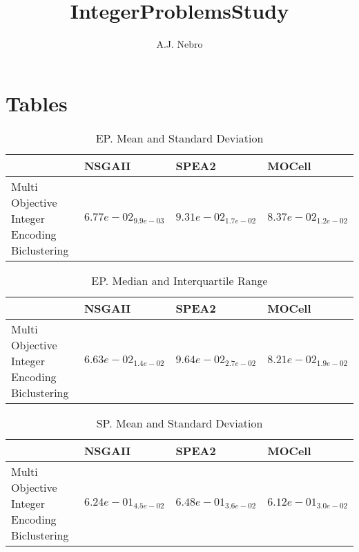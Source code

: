 \documentclass{article}
\title{IntegerProblemsStudy}
\author{A.J. Nebro}
\begin{document}
\maketitle
\section{Tables}

\begin{table}
\caption{EP. Mean and Standard Deviation}
\label{table: EP}
\centering
\begin{scriptsize}
\begin{tabular}{llll}
\hline & NSGAII & SPEA2 &  MOCell\\
\hline 
Multi Objective Integer Encoding Biclustering & \cellcolor{gray95}$  6.77e-02_{ 9.9e-03}$ & $  9.31e-02_{ 1.7e-02}$ & \cellcolor{gray25}$  8.37e-02_{ 1.2e-02}$ \\
\hline
\end{tabular}
\end{scriptsize}
\end{table}

\begin{table}
\caption{EP. Median and Interquartile Range}
\label{table: EP}
\centering
\begin{scriptsize}
\begin{tabular}{llll}
\hline & NSGAII & SPEA2 &  MOCell\\
\hline 
Multi Objective Integer Encoding Biclustering & \cellcolor{gray95}$  6.63e-02_{ 1.4e-02}$ & $  9.64e-02_{ 2.7e-02}$ & \cellcolor{gray25}$  8.21e-02_{ 1.9e-02}$ \\
\hline
\end{tabular}
\end{scriptsize}
\end{table}

\begin{table}
\caption{SP. Mean and Standard Deviation}
\label{table: SP}
\centering
\begin{scriptsize}
\begin{tabular}{llll}
\hline & NSGAII & SPEA2 &  MOCell\\
\hline 
Multi Objective Integer Encoding Biclustering & \cellcolor{gray25}$  6.24e-01_{ 4.5e-02}$ & $  6.48e-01_{ 3.6e-02}$ & \cellcolor{gray95}$  6.12e-01_{ 3.0e-02}$ \\
\hline
\end{tabular}
\end{scriptsize}
\end{table}
\end{document}

